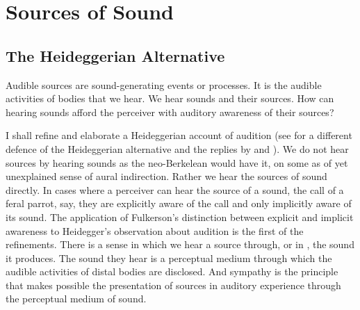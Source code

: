 \chapter{Sources of Sound} %
\label{cha:sources_of_sound}

\section{The Heideggerian Alternative} %
\label{sec:the_heideggerian_alternative}

Audible sources are sound-generating events or processes. It is the audible activities of bodies that we hear. We hear sounds and their sources. How can hearing sounds afford the perceiver with auditory awareness of their sources?

I shall refine and elaborate a Heideggerian account of audition (see \citealt{Leddington:2014aa} for a different defence of the Heideggerian alternative and the replies by \citealt{OCallaghan:2014aa} and \citealt{Nudds:2014aa}). We do not hear sources by hearing sounds as the neo-Berkelean would have it, on some as of yet unexplained sense of aural indirection. Rather we hear the sources of sound directly. In cases where a perceiver can hear the source of a sound, the call of a feral parrot, say, they are explicitly aware of the call and only implicitly aware of its sound. The application of Fulkerson's \citeyearpar{Fulkerson:2014ek} distinction between explicit and implicit awareness to Heidegger's \citeyearpar{Heidegger:1935uq} observation about audition is the first of the refinements. There is a sense in which we hear a source through, or in \citep{Leddington:2014aa}, the sound it produces. The sound they hear is a perceptual medium through which the audible activities of distal bodies are disclosed. And sympathy is the principle that makes possible the presentation of sources in auditory experience through the perceptual medium of sound.


